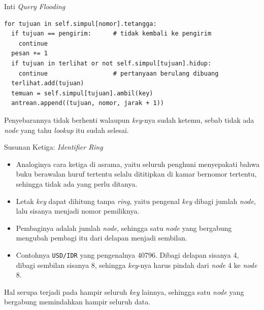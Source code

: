 \documentclass[aspectratio=169, table, 12pt]{beamer}
\begin{document}
\begin{frame}[fragile]{{\Large Inti \textit{Query Flooding}}}
  \vspace{4pt}
\begin{lstlisting}[style=PythonStyle]
for tujuan in self.simpul[nomor].tetangga:
  if tujuan == pengirim:      # tidak kembali ke pengirim
    continue
  pesan += 1
  if tujuan in terlihat or not self.simpul[tujuan].hidup:
    continue                  # pertanyaan berulang dibuang
  terlihat.add(tujuan)
  temuan = self.simpul[tujuan].ambil(key)
  antrean.append((tujuan, nomor, jarak + 1))
\end{lstlisting}
  \vspace{4pt}
  {\small Penyebarannya tidak berhenti walaupun \textit{key}-nya sudah ketemu, sebab
  tidak ada \textit{node} yang tahu \textit{lookup} itu sudah selesai.}
\end{frame}

\begin{frame}{{\Large Susunan Ketiga: \textit{Identifier Ring}}}
  \vspace{8pt}
  \begin{itemize}\small
    \item Analoginya cara ketiga di asrama, yaitu seluruh penghuni
          menyepakati bahwa buku berawalan huruf tertentu selalu dititipkan di
          kamar bernomor tertentu, sehingga tidak ada yang perlu ditanya.
    \item Letak \textit{key} dapat dihitung tanpa \textit{ring}, yaitu pengenal
          \textit{key} dibagi jumlah \textit{node}, lalu sisanya menjadi nomor
          pemiliknya.
    \item Pembaginya adalah jumlah \textit{node}, sehingga satu \textit{node}
          yang bergabung mengubah pembagi itu dari delapan menjadi sembilan.
    \item Contohnya \texttt{USD/IDR} yang pengenalnya 40796. Dibagi delapan
          sisanya 4, dibagi sembilan sisanya 8, sehingga \textit{key}-nya harus pindah
          dari \textit{node} 4 ke \textit{node} 8.
  \end{itemize}

  \vspace{10pt}
  {\small Hal serupa terjadi pada hampir seluruh \textit{key} lainnya, sehingga satu
  \textit{node} yang bergabung memindahkan hampir seluruh data.}
\end{frame}
\end{document}
